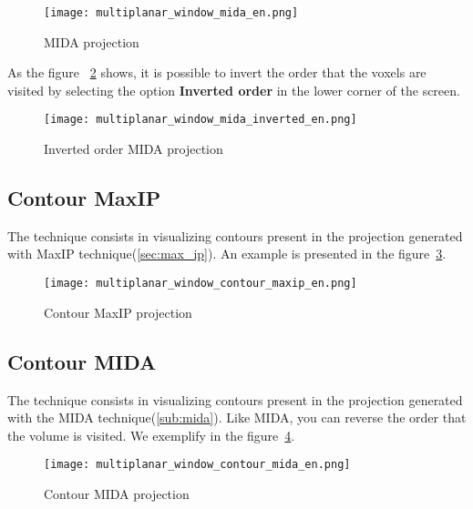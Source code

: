 \begin{figure}[H]
\centering
\texttt{[image: multiplanar\_window\_mida\_en.png]}
\caption{MIDA projection}
\label{fig:proj_MIDA}
\end{figure}

As the figure ~\ref{fig:proj_MIDA_inv} shows, it is possible to invert the order that the voxels are visited by selecting the option \textbf{Inverted order} in the lower corner of the screen.

\begin{figure}[H]
\centering
\texttt{[image: multiplanar\_window\_mida\_inverted\_en.png]}
\caption{Inverted order MIDA projection}
\label{fig:proj_MIDA_inv}
\end{figure}

\subsection{Contour MaxIP}

The technique consists in visualizing contours present in the projection generated with MaxIP technique(\ref{sec:max_ip}). An example is presented in the figure~\ref{fig:proj_contorno_maxip}.

\begin{figure}[H]
\centering
\texttt{[image: multiplanar\_window\_contour\_maxip\_en.png]}
\caption{Contour MaxIP projection}
\label{fig:proj_contorno_maxip}
\end{figure}

\subsection{Contour MIDA}

The technique consists in visualizing contours present in the projection generated with the MIDA technique(\ref{sub:mida}). Like MIDA, you can reverse the order that the volume is visited. We exemplify in the figure~\ref{fig:proj_contorno_mida}.

\begin{figure}[H]
\centering
\texttt{[image: multiplanar\_window\_contour\_mida\_en.png]}
\caption{Contour MIDA projection}
\label{fig:proj_contorno_mida}
\end{figure}